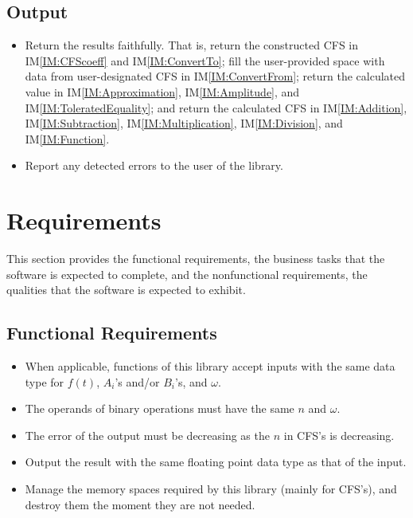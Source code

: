 \documentclass[12pt]{article}
\newcommand{\iref}[1]{IM\ref{#1}}
\newcounter{reqnum} %
\newcounter{outputnum} %
\begin{document}
\subsection{Output} \label{sec_Output}    
\begin{itemize}
	\item[O\refstepcounter{outputnum}\theoutputnum \label{Output:Faithful}:] Return
	the results faithfully. That is, return the constructed CFS in
	\iref{IM:CFScoeff} and \iref{IM:ConvertTo}; fill the user-provided space with
	data from user-designated CFS in \iref{IM:ConvertFrom}; return the calculated
	value in \iref{IM:Approximation}, \iref{IM:Amplitude}, and
	\iref{IM:ToleratedEquality}; and return the calculated CFS in
	\iref{IM:Addition}, \iref{IM:Subtraction}, \iref{IM:Multiplication},
	\iref{IM:Division}, and \iref{IM:Function}.
	\item[O\refstepcounter{outputnum}\theoutputnum \label{Output:Error}:] 
	Report any detected errors to the user of the library.
\end{itemize}
\section{Requirements}\label{Sc:Req}

This section provides the functional requirements, the business tasks that the
software is expected to complete, and the nonfunctional requirements, the
qualities that the software is expected to exhibit.

\subsection{Functional Requirements}

\noindent \begin{itemize}
	\newcommand{\ritem}[1]{\item[R\refstepcounter{reqnum}\thereqnum \label{R:#1}:]}
	\ritem{InputDataType} 
	When applicable, functions of this library accept inputs with the same 
	data type for $f(t)$, $A_i$'s and/or $B_i$'s, and $\omega$. 
	\ritem{BinaryOperationMatch}
	The operands of binary operations must have the same $n$ and $\omega$.
	\ritem{OutputError} 
	The error of the output must be decreasing as the $n$ in CFS's is decreasing.
	\ritem{OutputDataType} 
	Output the result with the same floating point data type as that of the input.
	\ritem{Memory} 
	Manage the memory spaces required by this library 
	(mainly for CFS's), and destroy them the moment they are not needed.
\end{itemize}
\end{document}
